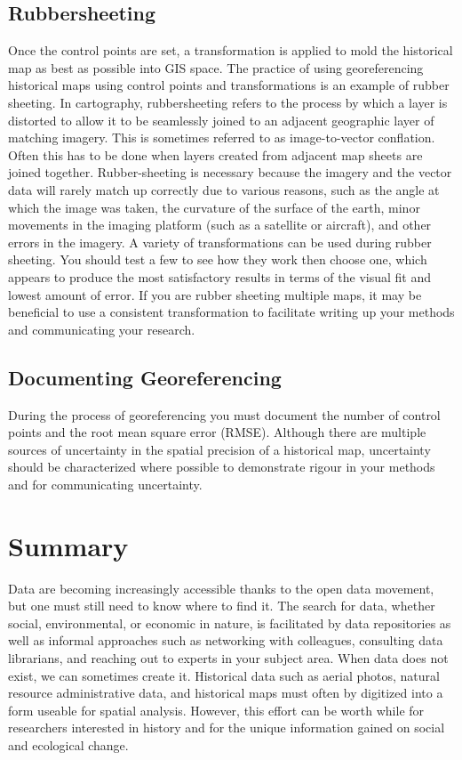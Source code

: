 \documentclass[
]{book}
\begin{document}
\hypertarget{rubbersheeting}{%
\subsection{Rubbersheeting}\label{rubbersheeting}}

Once the control points are set, a transformation is applied to mold the historical map as best as possible into GIS space. The practice of using georeferencing historical maps using control points and transformations is an example of rubber sheeting. In cartography, rubbersheeting refers to the process by which a layer is distorted to allow it to be seamlessly joined to an adjacent geographic layer of matching imagery. This is sometimes referred to as image-to-vector conflation. Often this has to be done when layers created from adjacent map sheets are joined together. Rubber-sheeting is necessary because the imagery and the vector data will rarely match up correctly due to various reasons, such as the angle at which the image was taken, the curvature of the surface of the earth, minor movements in the imaging platform (such as a satellite or aircraft), and other errors in the imagery. A variety of transformations can be used during rubber sheeting. You should test a few to see how they work then choose one, which appears to produce the most satisfactory results in terms of the visual fit and lowest amount of error. If you are rubber sheeting multiple maps, it may be beneficial to use a consistent transformation to facilitate writing up your methods and communicating your research.

\hypertarget{documenting-georeferencing}{%
\subsection{Documenting Georeferencing}\label{documenting-georeferencing}}

During the process of georeferencing you must document the number of control points and the root mean square error (RMSE). Although there are multiple sources of uncertainty in the spatial precision of a historical map, uncertainty should be characterized where possible to demonstrate rigour in your methods and for communicating uncertainty.

\hypertarget{summary-3}{%
\section{Summary}\label{summary-3}}

Data are becoming increasingly accessible thanks to the open data movement, but one must still need to know where to find it. The search for data, whether social, environmental, or economic in nature, is facilitated by data repositories as well as informal approaches such as networking with colleagues, consulting data librarians, and reaching out to experts in your subject area. When data does not exist, we can sometimes create it. Historical data such as aerial photos, natural resource administrative data, and historical maps must often by digitized into a form useable for spatial analysis. However, this effort can be worth while for researchers interested in history and for the unique information gained on social and ecological change.
\end{document}
